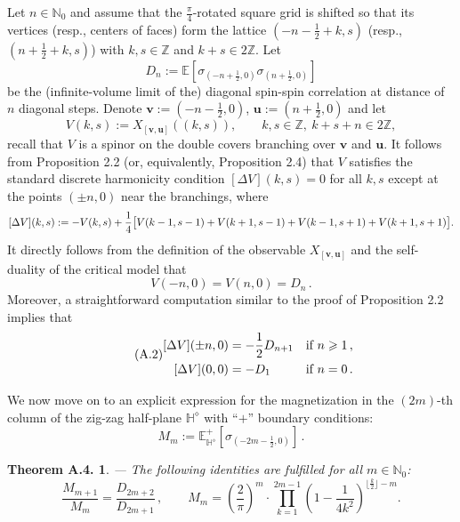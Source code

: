 \documentclass[11pt]{article}
\newcommand{\HHd}{\mathbb{H}^{\diamond}}
\newtheorem*{thmA}{Theorem A.4.}
\begin{document}
Let $n\in\mathbb{N}_0$ and assume that the $\frac{\pi}{4}$-rotated square grid is shifted
so that its vertices (resp., centers of faces) form the lattice $(-n-\frac12+k,s)$
(resp., $(n+\frac12+k,s)$) with $k,s\in\mathbb{Z}$ and $k+s\in 2\mathbb{Z}$. Let
\[
  D_n := \mathbb{E}[\sigma_{(-n+\frac12,0)}\sigma_{(n+\frac12,0)}]
\]
be the (infinite-volume limit of the) diagonal spin-spin correlation at distance of
$n$ diagonal steps. Denote $\mathbf{v}:=(-n-\frac12,0)$, $\mathbf{u}:=(n+\frac12,0)$ and let
\[
  V(k,s) := X_{[\mathbf{v},\mathbf{u}]}((k,s)),\qquad
  k,s\in\mathbb{Z},\ k+s+n\in 2\mathbb{Z},
\]
recall that $V$ is a spinor on the double covers branching over $\mathbf{v}$ and
$\mathbf{u}$. It follows from Proposition 2.2 (or, equivalently, Proposition 2.4) that
$V$ satisfies the standard discrete harmonicity condition $[\Delta V](k,s)=0$ for all
$k,s$ except at the points $(\pm n,0)$ near the branchings, where
\[
  \relax[\Delta V](k,s) := -V(k,s) + \frac14\big[V(k-1,s-1)+V(k+1,s-1)
                                        + V(k-1,s+1)+V(k+1,s+1)\big].
\]
It directly follows from the definition of the observable $X_{[\mathbf{v},\mathbf{u}]}$
and the self-duality of the critical model that
\begin{equation}
  \tag{A.1}
  V(-n,0) = V(n,0) = D_n\,.
\end{equation}
Moreover, a straightforward computation similar to the proof of Proposition 2.2 implies
that
\begin{equation}
  \tag{A.2}
  \begin{aligned}
    \relax[\Delta V](\pm n,0) &= -\frac12 D_{n+1} &&\text{if } n\geqslant 1\,,\\
    \relax[\Delta V](0,0) &= -D_1 &&\text{if } n=0\,.
  \end{aligned}
\end{equation}



We now move on to an explicit expression for the magnetization in the $(2m)$-th column
of the zig-zag half-plane $\HHd$ with ``$+$'' boundary conditions:
\[
  M_m := \mathbb{E}^{+}_{\HHd}[\sigma_{(-2m-\frac12,0)}]\,.
\]

\begin{thmA}
--- The following identities are fulfilled for all $m\in\mathbb{N}_0$:
\begin{equation}
  \tag{A.5}
  \frac{M_{m+1}}{M_m} = \frac{D_{2m+2}}{D_{2m+1}}\,,\qquad
  M_m = \left(\frac{2}{\pi}\right)^{m}\cdot
        \prod_{k=1}^{2m-1}\left(1-\frac{1}{4k^2}\right)^{\lfloor\frac{k}{2}\rfloor-m}.
\end{equation}
\end{thmA}
\end{document}

